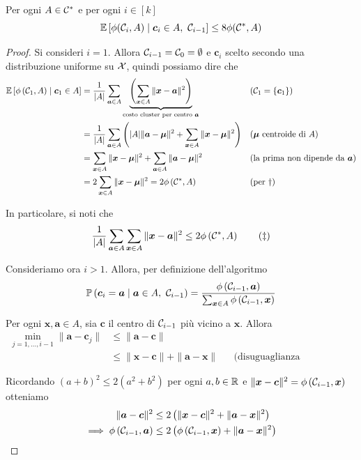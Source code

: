 \begin{lemma}
    \label{lemma:kmpp-hell}
    Per ogni $A \in \mathcal{C}^\ast$ e per ogni $i \in [k]$
    $$ \mathbb{E} \left[\phi(\mathcal{C}_i, A) \mid \bm c_i \in A, \ \mathcal{C}_{i-1} \right] \leq 8 \phi (\mathcal{C}^\ast, A) $$
\end{lemma}
\begin{proof}
    Si consideri $i=1$. Allora $\mathcal{C}_{i-1} = \mathcal{C}_0 = \emptyset$ e $\bm c_i$  scelto secondo una distribuzione uniforme su $\mathcal{X}$, quindi possiamo dire che
    \begin{align*}
        \mathbb{E} \left[\phi \left(\mathcal{C}_1, A\right) \mid \bm c_1 \in A\right] & = \frac{1}{|A|} \sum_{\bm a \in A} \underbrace{\left(\sum_{\bm x \in A} \| \bm x - \bm a \|^2 \right)}_{\text{costo cluster per centro } \bm a} && (\mathcal{C}_1 = \left\{\bm c_1\right\}) \\
        & = \frac{1}{|A|} \sum_{\bm a \in A} \left(|A| \| \bm a - \bm \mu \|^2 + \sum_{\bm x \in A} \| \bm x - \bm \mu \|^2\right) && (\bm \mu \text{ centroide di } A) \\
        & = \sum_{\bm x \in A} \|\bm x - \bm \mu \|^2 +\sum_{\bm a \in A} \| \bm a - \bm \mu \|^2 && (\text{la prima non dipende da } \bm a) \\
        & = 2 \sum_{\bm x \in A} \| \bm x - \bm \mu \|^2 = 2 \phi \left(\mathcal{C}^\ast, A \right) && (\text{per }\dag)
    \end{align*}

    In particolare, si noti che
    \[ \frac{1}{|A|} \sum_{\bm a \in A} \sum_{\bm x \in A} \| \bm x - \bm a \|^2 \leq 2 \phi \left(\mathcal{C}^\ast, A\right) \tag*{$(\ddag)$}\]

    Consideriamo ora $i > 1$. Allora, per definizione dell'algoritmo
    $$ \mathbb{P} \left(\bm c_i = \bm a \mid \bm a \in A, \ \mathcal{C}_{i-1} \right) = \frac{\phi \left(\mathcal{C}_{i-1}, \bm a\right)}{\sum_{\bm x \in A} \phi \left(\mathcal{C}_{i-1}, \bm x\right)}$$

    Per ogni $\bm x, \bm a \in A$, sia $\bm c$ il centro di $\mathcal{C}_{i-1}$ più vicino a $\bm x$. Allora
    \begin{align*}
        \min_{j = 1, \dots, i-1} \| \bm a - \bm c_j \| & \leq \| \bm a - \bm c \| \\
        & \leq \| \bm x - \bm c \| + \| \bm a - \bm x \| && \text{(disuguaglianza triangolare)}
    \end{align*}

    Ricordando $(a + b)^2 \leq 2 (a^2 + b^2)$ per ogni $a,b \in \mathbb{R}$ e $\| \bm x - \bm c \|^2 = \phi \left(\mathcal{C}_{i-1}, \bm x\right)$ otteniamo
    \begin{align*}
        \| \bm a - \bm c \|^2 & \leq 2 \left( \| \bm x - \bm c \|^2 + \| \bm a - \bm x \|^2 \right) \\
        \implies \phi \left(\mathcal{C}_{i-1}, \bm a\right) & \leq 2 \left(\phi \left(\mathcal{C}_{i-1}, \bm x\right) + \| \bm a - \bm x \|^2 \right)
    \end{align*}


\end{proof}
